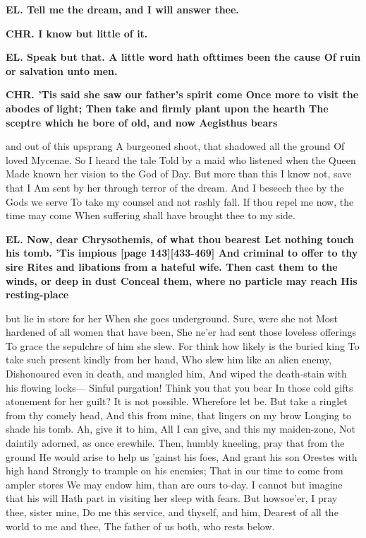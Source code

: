 \documentclass[11pt,letter]{book}
\begin{document}
\par \textbf{EL. Tell me the dream, and I will answer thee.}
\par 

\par \textbf{CHR. I know but little of it.}
\par 

\par \textbf{EL. Speak but that. A little word hath ofttimes been the cause Of ruin or salvation unto men.}
\par 

\par \textbf{CHR. ’Tis said she saw our father’s spirit come Once more to visit the abodes of light; Then take and firmly plant upon the hearth The sceptre which he bore of old, and now Aegisthus bears}
\par   and out of this upsprang A burgeoned shoot, that shadowed all the ground Of loved Mycenae. So I heard the tale Told by a maid who listened when the Queen Made known her vision to the God of Day. But more than this I know not, save that I Am sent by her through terror of the dream. And I beseech thee by the Gods we serve To take my counsel and not rashly fall. If thou repel me now, the time may come When suffering shall have brought thee to my side.

\par \textbf{EL. Now, dear Chrysothemis, of what thou bearest Let nothing touch his tomb. ’Tis impious [page 143][433-469] And criminal to offer to thy sire Rites and libations from a hateful wife. Then cast them to the winds, or deep in dust Conceal them, where no particle may reach His resting-place}
\par   but lie in store for her When she goes underground. Sure, were she not Most hardened of all women that have been, She ne’er had sent those loveless offerings To grace the sepulchre of him she slew. For think how likely is the buried king To take such present kindly from her hand, Who slew him like an alien enemy, Dishonoured even in death, and mangled him, And wiped the death-stain with his flowing locks— Sinful purgation! Think you that you bear In those cold gifts atonement for her guilt? It is not possible. Wherefore let be. But take a ringlet from thy comely head, And this from mine, that lingers on my brow Longing to shade his tomb. Ah, give it to him, All I can give, and this my maiden-zone, Not daintily adorned, as once erewhile. Then, humbly kneeling, pray that from the ground He would arise to help us ’gainst his foes, And grant his son Orestes with high hand Strongly to trample on his enemies; That in our time to come from ampler stores We may endow him, than are ours to-day. I cannot but imagine that his will Hath part in visiting her sleep with fears. But howsoe’er, I pray thee, sister mine, Do me this service, and thyself, and him, Dearest of all the world to me and thee, The father of us both, who rests below.
\end{document}
